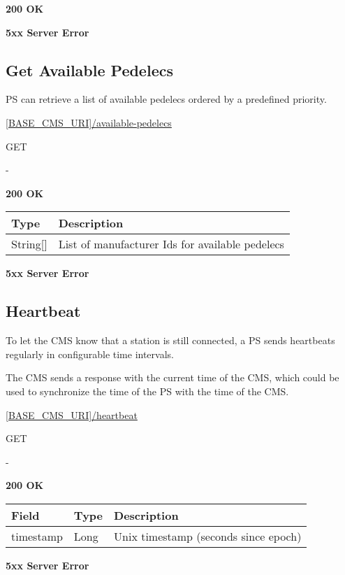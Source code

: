  \textbf{200 OK}

 \textbf{5xx Server Error}

\subsection{Get Available Pedelecs}

\acs{PS} can retrieve a list of available pedelecs ordered by a predefined priority.

 \url{[BASE_CMS_URI]/available-pedelecs}

 GET

 -

 \textbf{200 OK}

\begin{tabularx}{\linewidth}{ | l | X | }
  \hline
  \rowcolor{table-head}
  Type & Description \\
  \hline
  	String[] & List of manufacturer Ids for available pedelecs \\	
  \hline
\end{tabularx}

 \textbf{5xx Server Error}

\subsection{Heartbeat}

To let the \acs{CMS} know that a station is still connected, a \acs{PS} sends heartbeats regularly in configurable time intervals.

The \acs{CMS} sends a response with the current time of the \acs{CMS}, which could be used to synchronize the time of the \acs{PS} with the time of the \acs{CMS}.

 \url{[BASE_CMS_URI]/heartbeat}

 GET

 -

 \textbf{200 OK}

\begin{tabularx}{\linewidth}{ | l | l | X | }
  \hline
  \rowcolor{table-head}
  Field & Type & Description \\
  \hline
  	timestamp & Long			& Unix timestamp (seconds since epoch) \\	
  \hline
\end{tabularx}


 \textbf{5xx Server Error}
